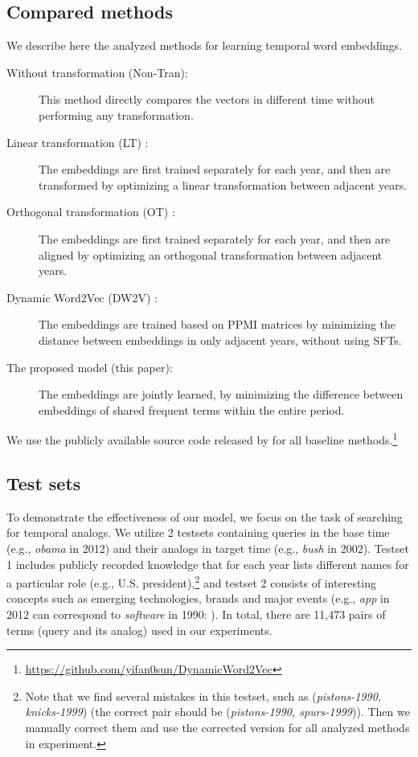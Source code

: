 \documentclass[output=paper]{langsci/langscibook}
\begin{document}
\subsection{Compared methods}
We describe here the analyzed methods for learning temporal word embeddings.

\begin{description}
\item[Without transformation (Non-Tran):] This method directly compares the vectors in different time without performing any transformation.

\item[Linear transformation (LT) \citep{zhang-etal-2015-omnia}:] The embeddings are first trained separately for each year, and then are transformed by optimizing a linear transformation between adjacent years. 

\item[Orthogonal transformation (OT) \citep{hamilton-etal-2016-diachronic}:] The embeddings are first trained separately for each year, and then are aligned by optimizing an orthogonal transformation between adjacent years.

\item[Dynamic Word2Vec (DW2V) \citep{yao2018dynamic}:] The embeddings are trained based on PPMI matrices by minimizing the distance between embeddings in only adjacent years, without using SFTs.

\item[The proposed model (this paper):] The embeddings are jointly learned, by minimizing the difference between embeddings of shared frequent terms within the entire period.
\end{description}

We use the publicly available source code released by \citep{yao2018dynamic} for all baseline methods.\footnote{\url{https://github.com/yifan0sun/DynamicWord2Vec}}

\subsection{Test sets}

To demonstrate the effectiveness of our model, we focus on the task of searching for temporal analogs. 
We utilize 2 testsets \citep{yao2018dynamic} containing queries in the base time (e.g., \textit{obama} in 2012) and their analogs in target time (e.g., \textit{bush} in 2002).
Testset 1 includes publicly recorded knowledge that for each year lists different names for a particular role (e.g., U.S. president),\footnote{Note that we find several mistakes in this testset, such as (\textit{pistons-1990, knicks-1999}) (the correct pair should be (\textit{pistons-1990, spurs-1999})). Then we manually correct them and use the corrected version for all analyzed methods in experiment.} and testset 2 consists of interesting concepts such as emerging technologies, brands and major events (e.g., \textit{app} in 2012 can correspond to \textit{software} in 1990: \citealp{yao2018dynamic}).
In total, there are 11,473 pairs of terms (query and its analog) used in our experiments.
\end{document}
